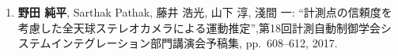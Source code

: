 \begin{enumerate}
\item
\textbf{野田 純平}, Sarthak Pathak, 藤井 浩光, 山下 淳, 淺間 一: ``計測点の信頼度を考慮した全天球ステレオカメラによる運動推定”,第18回計測自動制御学会システムインテグレーション部門講演会予稿集, pp.~608--612, 2017.
\\
\end{enumerate}




